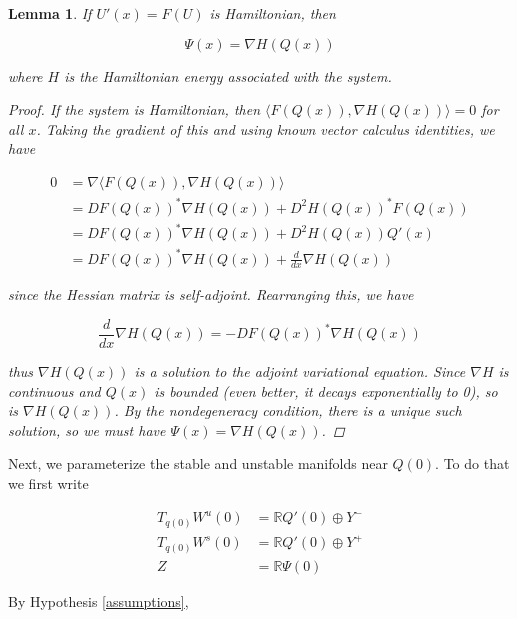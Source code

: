 \documentclass[12pt]{article}
\def\R{{\mathbb R}}
\newtheorem{lemma}{Lemma}
\begin{document}
\begin{lemma}

If $U'(x) = F(U)$ is Hamiltonian, then

\begin{equation}
\Psi(x) = \nabla H(Q(x))
\end{equation}

where $H$ is the Hamiltonian energy associated with the system.

\begin{proof}

If the system is Hamiltonian, then $\langle F(Q(x)), \nabla H(Q(x)) \rangle = 0$ for all $x$. Taking the gradient of this and using known vector calculus identities, we have

\begin{align*}
0 &= \nabla \langle F(Q(x)), \nabla H(Q(x)) \rangle \\
&= D F(Q(x))^* \nabla H(Q(x)) + D^2 H(Q(x))^* F(Q(x)) \\
&= D F(Q(x))^* \nabla H(Q(x)) + D^2 H(Q(x)) Q'(x) \\
&= D F(Q(x))^* \nabla H(Q(x)) + \frac{d}{dx} \nabla H(Q(x))
\end{align*}

since the Hessian matrix is self-adjoint. Rearranging this, we have

\begin{equation}
\frac{d}{dx} \nabla H(Q(x)) = -D F(Q(x))^* \nabla H(Q(x)) 
\end{equation}

thus $\nabla H(Q(x))$ is a solution to the adjoint variational equation. Since $\nabla H$ is continuous and $Q(x)$ is bounded (even better, it decays exponentially to 0), so is $\nabla H(Q(x))$. By the nondegeneracy condition, there is a unique such solution, so we must have $\Psi(x) = \nabla H(Q(x))$.

\end{proof}
\end{lemma}

Next, we parameterize the stable and unstable manifolds near $Q(0)$. To do that we first write

\begin{align*}
T_{q(0)}W^u(0) &= \R Q'(0) \oplus Y^- \\
T_{q(0)}W^s(0) &= \R Q'(0) \oplus Y^+ \\
Z &= \R \Psi(0)
\end{align*}

By Hypothesis \ref{assumptions},
\end{document}
